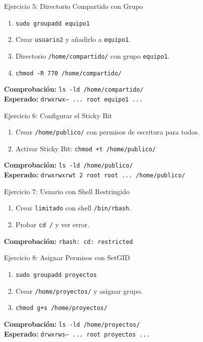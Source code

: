 \documentclass{beamer}
\begin{document}
\begin{frame}{Ejercicio 5: Directorio Compartido con Grupo}
    \begin{enumerate}
        \item \texttt{sudo groupadd equipo1}
        \item Crear \texttt{usuario2} y añadirlo a \texttt{equipo1}.
        \item Directorio \texttt{/home/compartido/} con grupo \texttt{equipo1}.
        \item \texttt{chmod -R 770 /home/compartido/}
    \end{enumerate}
    \textbf{Comprobación:} \texttt{ls -ld /home/compartido/} \\
    \textbf{Esperado:} \texttt{drwxrwx--- ... root equipo1 ...}
\end{frame}

\begin{frame}{Ejercicio 6: Configurar el Sticky Bit}
    \begin{enumerate}
        \item Crear \texttt{/home/publico/} con permisos de escritura para todos.
        \item Activar Sticky Bit: \texttt{chmod +t /home/publico/}
    \end{enumerate}
    \textbf{Comprobación:} \texttt{ls -ld /home/publico/} \\
    \textbf{Esperado:} \texttt{drwxrwxrwt 2 root root ... /home/publico/}
\end{frame}

\begin{frame}{Ejercicio 7: Usuario con Shell Restringido}
    \begin{enumerate}
        \item Crear \texttt{limitado} con shell \texttt{/bin/rbash}.
        \item Probar \texttt{cd /} y ver error.
    \end{enumerate}
    \textbf{Comprobación:} \texttt{rbash: cd: restricted}
\end{frame}

\begin{frame}{Ejercicio 8: Asignar Permisos con SetGID}
    \begin{enumerate}
        \item \texttt{sudo groupadd proyectos}
        \item Crear \texttt{/home/proyectos/} y asignar grupo.
        \item \texttt{chmod g+s /home/proyectos/}
    \end{enumerate}
    \textbf{Comprobación:} \texttt{ls -ld /home/proyectos/} \\
    \textbf{Esperado:} \texttt{drwxrws--- ... root proyectos ...}
\end{frame}
\end{document}
